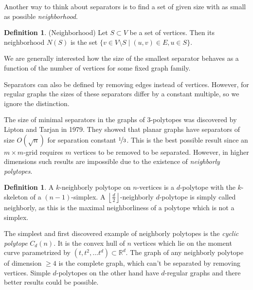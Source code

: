 \documentclass[a4paper,12pt]{book}
\theoremstyle{plain}
\newtheorem{conjecture}[theorem]{Conjecture}
\theoremstyle{definition}
\newtheorem{definition}[theorem]{Definition}
\newcommand\NC{\textrm{NCP}}
\begin{document}
Another way to think about separators is to find a set of given size with as small
as possible \textit{neighborhood}.

\begin{definition}
 (Neighborhood) Let $S \subset V$ be a set of vertices. Then its neighborhood 
$N(S)$ is the set $\{v \in V\setminus S \mid (u,v) \in E, u \in S\}$. 
\end{definition}

We are generally interested how the size of the smallest separator behaves as a 
function 
of the number of vertices for some fixed graph family.

Separators can also be defined by removing edges instead of vertices. However, 
for regular graphs the sizes of these separators differ by a constant multiple,
so we ignore the distinction.

The size of minimal separators in the graphs of 3-polytopes was discovered by 
Lipton and Tarjan \cite{LiTa} in 1979. They showed that planar graphs have 
separators of size $O(\sqrt{n})$ for separation constant $\nicefrac{1}{3}$. This is 
the best possible result since an $m\times m$-grid requires $m$ vertices to be 
removed to be separated. However, in higher dimensions such results are 
impossible due to the existence of \textit{neighborly polytopes}.

\begin{definition}
 A $k$-neighborly polytope on $n$-vertices is a $d$-polytope with the $k$-skeleton of a $(n-1)$-simplex.
A $\left\lfloor \frac{d}{2} \right\rfloor$-neighborly $d$-polytope is simply called neighborly, as this is the maximal
neighborliness of a polytope which is not a simplex.
\end{definition}

The simplest and first discovered example of neighborly polytopes is the \textit{cyclic polytope} $C_d(n)$.
It is the convex hull of $n$ vertices which lie on the moment curve parametrized by $(t,t^2,\dots t^d) \subset \mathbb{R}^d$.
The graph of any neighborly polytope of dimension $\geq 4$ is the complete graph, which can't be separated by removing vertices. Simple 
$d$-polytopes on the other hand have $d$-regular graphs and there better results could be 
possible. 

%
%
%
%
\end{document}
